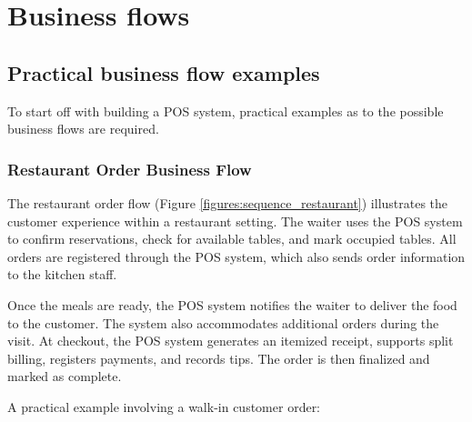 \documentclass[11pt,a4paper,pdftex]{article}
\begin{document}
\section{Business flows}
\subsection{Practical business flow examples}
To start off with building a POS system, practical examples as to the possible business flows are required.

\subsubsection{Restaurant Order Business Flow}
The restaurant order flow (Figure \ref{figures:sequence_restaurant}) illustrates the customer experience within a restaurant setting. The waiter uses the POS system to confirm reservations, check for available tables, and mark occupied tables. All orders are registered through the POS system, which also sends order information to the kitchen staff.

Once the meals are ready, the POS system notifies the waiter to deliver the food to the customer. The system also accommodates additional orders during the visit. At checkout, the POS system generates an itemized receipt, supports split billing, registers payments, and records tips. The order is then finalized and marked as complete. 

A practical example involving a walk-in customer order:
\end{document}
